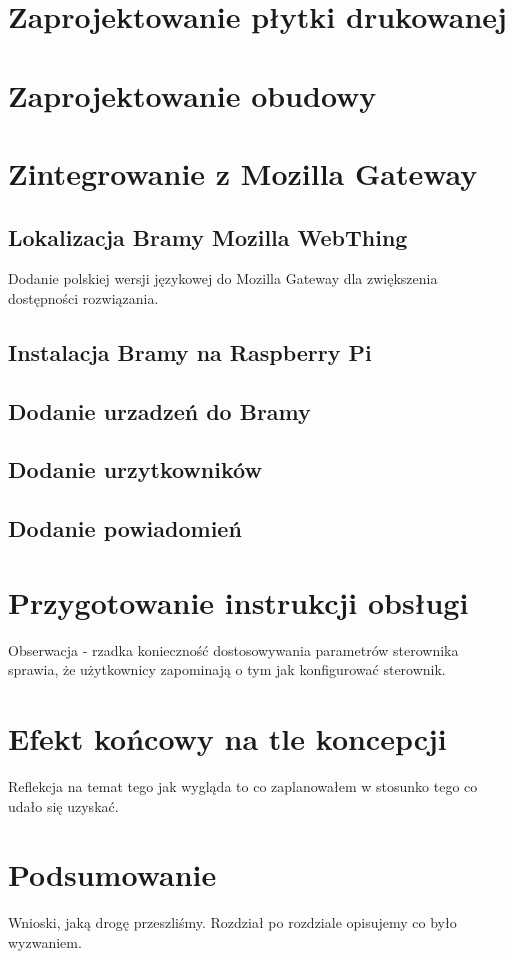 \documentclass[12pt]{report}
\begin{document}
 
 \chapter{Zaprojektowanie płytki drukowanej}
 
 
 \chapter{Zaprojektowanie obudowy}

 
 \chapter{Zintegrowanie z Mozilla Gateway}
 \section{Lokalizacja Bramy Mozilla WebThing}
 Dodanie polskiej wersji językowej do Mozilla Gateway dla zwiększenia dostępności rozwiązania.
 \section{Instalacja Bramy na Raspberry Pi}
 \section{Dodanie urzadzeń do Bramy}
 \section{Dodanie urzytkowników}
 \section{Dodanie powiadomień}
 
 \chapter{Przygotowanie instrukcji obsługi}
 Obserwacja - rzadka konieczność dostosowywania parametrów sterownika sprawia, że użytkownicy zapominają o tym jak konfigurować sterownik.
 
 
 \chapter{Efekt końcowy na tle koncepcji}
 Reflekcja na temat tego jak wygląda to co zaplanowałem w stosunko tego co udało się uzyskać.
 
 
 \chapter*{Podsumowanie}
 Wnioski, jaką drogę przeszliśmy. Rozdział po rozdziale opisujemy co było wyzwaniem.
 
\end{document}
